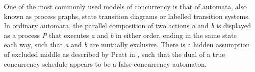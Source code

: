\documentclass[9pt, english, a4paper]{article}
\theoremstyle{definition}
\begin{document}





	One of the most commonly used models of concurrency is that of automata, also known as process graphs, state transition diagrams or labelled transition systems. In ordinary automata, the parallel composition of two actions \emph{a} and \emph{b} is displayed as a process \emph{P} that executes \emph{a} and \emph{b} in either order, ending in the same state each way, such that \emph{a} and \emph{b} are mutually exclusive. There is a hidden assumption of excluded middle as described by Pratt in \cite{pratt1991}, such that the dual of a true concurrency schedule appears to be a false concurrency automaton.
\end{document}
